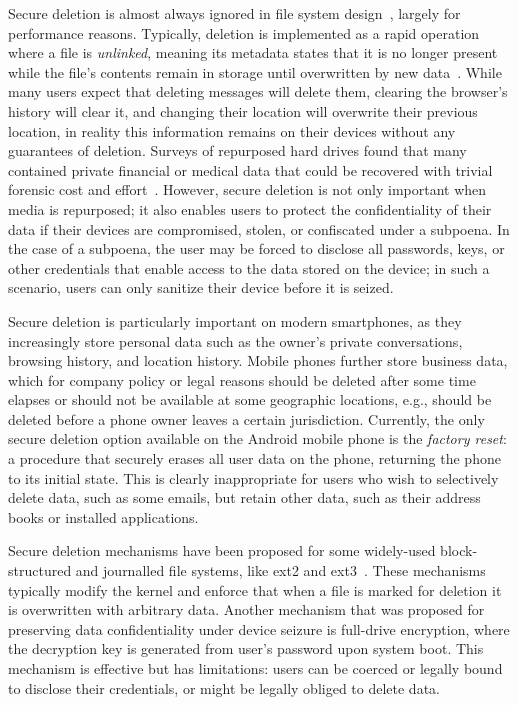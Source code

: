 \documentclass{acmtog}
\begin{document}
Secure deletion is almost always ignored in
file system design~\cite{ext2,yaffs,ubifs,ext4,logstructure,jffs}, largely for
performance reasons.  Typically, deletion is implemented as a rapid operation where a file is \emph{unlinked}, meaning its metadata
states that it is no longer present while the file's contents remain in
storage until overwritten by new data~\cite{survey}.
While many users expect that deleting messages will delete them, clearing the browser's history will clear it, and changing their
location will overwrite their previous location, in reality this information
remains on their devices without any guarantees of deletion.
Surveys of repurposed hard drives found that many contained private financial or
medical data that could be recovered with trivial forensic cost and
effort~\cite{survey}. 
However, secure deletion is not only important when media is repurposed; it
also enables users to protect the confidentiality of their data 
if their devices are compromised, stolen, or confiscated under a subpoena. In
the case of a subpoena, the user may 
be forced to disclose all passwords, keys, or other credentials that enable access to the data stored on the device; 
in such a scenario, users can only sanitize their device 
 before it is seized. 

Secure deletion is particularly important on modern smartphones,
as they increasingly 
store personal data such as the owner's private conversations, browsing
history, and location history.
Mobile phones further store business data, which for company policy or legal reasons should be 
deleted after some time elapses or should not be available at some geographic
locations, e.g., should be deleted before a phone owner leaves a certain
jurisdiction.
Currently, the only secure deletion option
available on the Android mobile phone is the \emph{factory reset}: a
procedure that securely erases all user data on the phone, 
returning the phone to its initial state. This is clearly inappropriate for users who
wish to selectively delete data, such as some emails, but retain other
data, such as their address books or installed applications.

Secure deletion mechanisms have been proposed for some widely-used block-structured and
journalled file systems, like ext2 and
ext3~\cite{ext2secdel,securemyths, purgefs}. These mechanisms typically modify
the kernel and enforce that 
when a file is marked for deletion it is overwritten with arbitrary data.
Another mechanism that was proposed for preserving data confidentiality under
device seizure is full-drive
encryption, where the decryption key is generated from user's password upon
system boot. This mechanism is effective but has limitations: users can be
coerced or legally bound to disclose their credentials, or might be legally
obliged to delete data.
\end{document}

